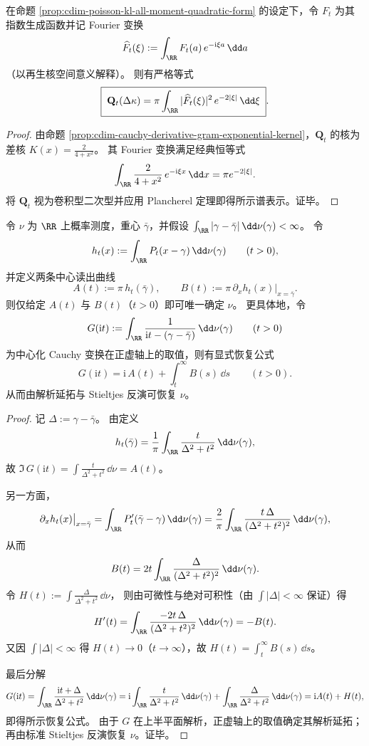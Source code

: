 \begin{proposition}\label{prop:cdim-poisson-kl-quadratic-form-spectral}
在命题 \ref{prop:cdim-poisson-kl-all-moment-quadratic-form} 的设定下，令 \(F_t\) 为其指数生成函数并记 Fourier 变换
\[
\widehat F_t(\xi):=\int_{\RR}F_t(a)\,e^{-\mathrm{i}\xi a}\,\dd a
\]
（以再生核空间意义解释）。
则有严格等式
\[
\boxed{\;
\mathbf Q_t(\Delta\kappa)=\pi\int_{\RR}|\widehat F_t(\xi)|^2\,e^{-2|\xi|}\,\dd\xi\; }.
\]
\end{proposition}
\begin{proof}
由命题 \ref{prop:cdim-cauchy-derivative-gram-exponential-kernel}，\(\mathbf Q_t\) 的核为差核 \(K(x)=\frac{2}{4+x^2}\)。
其 Fourier 变换满足经典恒等式
\[
\int_{\RR}\frac{2}{4+x^2}\,e^{-\mathrm{i}\xi x}\,\dd x=\pi e^{-2|\xi|}.
\]
将 \(\mathbf Q_t\) 视为卷积型二次型并应用 Plancherel 定理即得所示谱表示。证毕。
\end{proof}

\begin{proposition}\label{prop:cdim-poisson-central-two-channel-reconstruction}
令 \(\nu\) 为 \(\RR\) 上概率测度，重心 \(\bar\gamma\)，并假设 \(\int_{\RR}|\gamma-\bar\gamma|\,\dd\nu(\gamma)<\infty\)。
令
\[
h_t(x):=\int_{\RR}P_t(x-\gamma)\,\dd\nu(\gamma)\qquad(t>0),
\]
并定义两条中心读出曲线
\[
A(t):=\pi\,h_t(\bar\gamma),
\qquad
B(t):=\pi\,\partial_x h_t(x)\big|_{x=\bar\gamma}.
\]
则仅给定 \(A(t)\) 与 \(B(t)\)（\(t>0\)）即可唯一确定 \(\nu\)。
更具体地，令
\[
G(\mathrm{i}t):=\int_{\RR}\frac{1}{\mathrm{i}t-(\gamma-\bar\gamma)}\,\dd\nu(\gamma)\qquad(t>0)
\]
为中心化 Cauchy 变换在正虚轴上的取值，则有显式恢复公式
\[
\boxed{\;
G(\mathrm{i}t)
=\mathrm{i}\,A(t)+\int_t^\infty B(s)\,\dd s\qquad(t>0).\;}
\]
从而由解析延拓与 Stieltjes 反演可恢复 \(\nu\)。
\end{proposition}
\begin{proof}
记 \(\Delta:=\gamma-\bar\gamma\)。
由定义
\[
h_t(\bar\gamma)=\frac{1}{\pi}\int_{\RR}\frac{t}{\Delta^2+t^2}\,\dd\nu(\gamma),
\]
故 \(\Im\,G(\mathrm{i}t)=\int \frac{t}{\Delta^2+t^2}\,\dd\nu=A(t)\)。
\par
另一方面，
\[
\partial_x h_t(x)\big|_{x=\bar\gamma}
=\int_{\RR}P_t'(\bar\gamma-\gamma)\,\dd\nu(\gamma)
=\frac{2}{\pi}\int_{\RR}\frac{t\,\Delta}{(\Delta^2+t^2)^2}\,\dd\nu(\gamma),
\]
从而
\[
B(t)=2t\int_{\RR}\frac{\Delta}{(\Delta^2+t^2)^2}\,\dd\nu(\gamma).
\]
令
\(
H(t):=\int \frac{\Delta}{\Delta^2+t^2}\,\dd\nu
\)，
则由可微性与绝对可积性（由 \(\int|\Delta|<\infty\) 保证）得
\[
H'(t)=\int_{\RR}\frac{-2t\,\Delta}{(\Delta^2+t^2)^2}\,\dd\nu(\gamma)=-B(t).
\]
又因 \(\int|\Delta|<\infty\) 得 \(H(t)\to 0\)（\(t\to\infty\)），故
\(
H(t)=\int_t^\infty B(s)\,\dd s
\)。
\par
最后分解
\[
G(\mathrm{i}t)
=\int_{\RR}\frac{\mathrm{i}t+\Delta}{\Delta^2+t^2}\,\dd\nu(\gamma)
=\mathrm{i}\int_{\RR}\frac{t}{\Delta^2+t^2}\,\dd\nu(\gamma)+\int_{\RR}\frac{\Delta}{\Delta^2+t^2}\,\dd\nu(\gamma)
=\mathrm{i}A(t)+H(t),
\]
即得所示恢复公式。
由于 \(G\) 在上半平面解析，正虚轴上的取值确定其解析延拓；再由标准 Stieltjes 反演恢复 \(\nu\)。证毕。
\end{proof}

